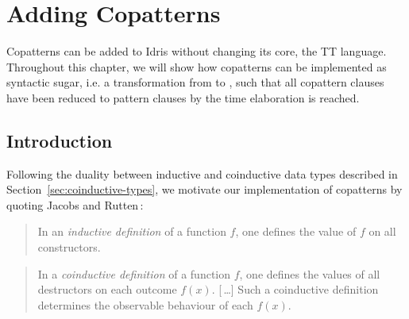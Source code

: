 \chapter{Adding Copatterns}
\label{sec:adding_copatterns}
Copatterns can be added to Idris without changing its core, the TT
language. Throughout this chapter, we will show how copatterns can be implemented as
syntactic sugar, i.e. a transformation from \IdrisM{} to \IdrisM{}, such that
all copattern clauses have been reduced to pattern clauses by the
time elaboration is reached.

\section{Introduction}
Following the duality between inductive and coinductive data types described in
Section~\ref{sec:coinductive-types}, we motivate our implementation of
copatterns by quoting Jacobs and Rutten\,\citep{Jacobs97atutorial}:

\begin{quote}
In an \emph{inductive definition} of a function $f$, one defines the value of $f$ on all constructors.
\end{quote}

\begin{quote}
In a \emph{coinductive definition} of a function $f$, one defines the values of all
destructors on each outcome $f(x)$. [$\,$\ldots] Such a coinductive definition
determines the observable behaviour of each $f(x)$.
\end{quote}

